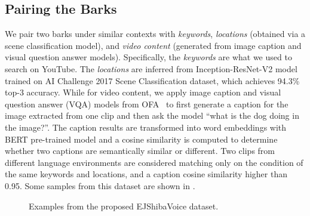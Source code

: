 \subsection{Pairing the Barks}
\label{sec: pair}
We pair two barks under similar contexts with \textit{keywords}, \textit{locations} (obtained via a scene classification model), and \textit{video content} (generated from image caption and visual question answer models).
Specifically, the \textit{keywords} are what we used to search on YouTube. 
The \textit{locations} are inferred from Inception-ResNet-V2 model\cite{szegedy2017inception} trained on AI Challenge 2017 Scene Classification dataset, which achieves 94.3\% top-3 accuracy.
While for video content, we apply image caption and visual question answer (VQA) models from OFA~\cite{wang2022unifying} to first generate a caption for the image extracted from one clip and then ask the model ``what is the dog doing in the image?''. 
The caption results are transformed into word embeddings with BERT pre-trained model\cite{devlin2018bert} and a cosine similarity is computed to determine whether two captions are semantically similar or different. 
Two clips from different language environments are considered matching only on the condition of the same keywords and locations, and a caption cosine similarity higher than 0.95. 
Some samples from this dataset are shown in .%

\begin{figure}[th]
	\centering
	\caption{Examples from the proposed EJShibaVoice dataset.}
	\label{fig:EJShiba}
\end{figure}

